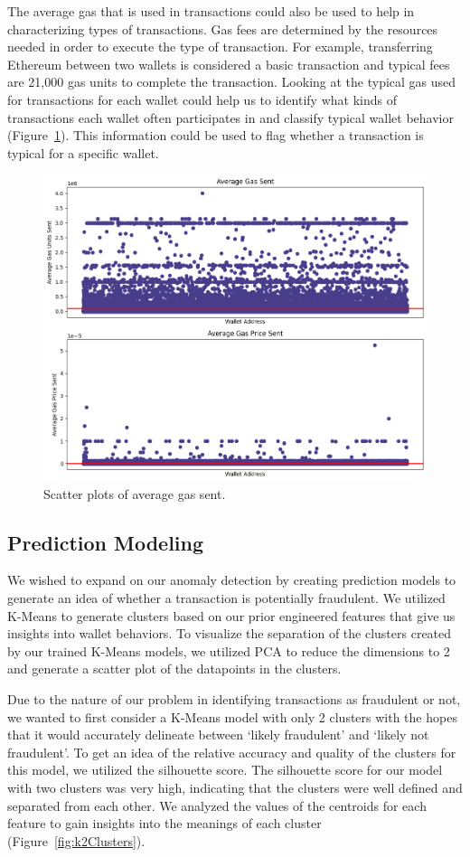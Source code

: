 \documentclass[sigconf]{acmart}
\begin{document}
The average gas that is used in transactions could also be used to help in characterizing types of transactions. Gas fees are determined by the resources needed in order to execute the type of transaction. For example, transferring Ethereum between two wallets is considered a basic transaction and typical fees are 21,000 gas units to complete the transaction. Looking at the typical gas used for transactions for each wallet could help us to identify what kinds of transactions each wallet often participates in and classify typical wallet behavior (Figure~\ref{fig:m6StackedAvgGasSent}). This information could be used to flag whether a transaction is typical for a specific wallet.

\begin{figure}[H]
    \centering
    \includegraphics[width=0.8\linewidth]{M6-2-avg-gas-sent.png}
    \caption{Scatter plots of average gas sent.}
    \label{fig:m6StackedAvgGasSent}
\end{figure}
	

\subsection{Prediction Modeling}
We wished to expand on our anomaly detection by creating prediction models to generate an idea of whether a transaction is potentially fraudulent. We utilized K-Means to generate clusters based on our prior engineered features that give us insights into wallet behaviors. To visualize the separation of the clusters created by our trained K-Means models, we utilized PCA to reduce the dimensions to 2 and generate a scatter plot of the datapoints in the clusters.  

Due to the nature of our problem in identifying transactions as fraudulent or not, we wanted to first consider a K-Means model with only 2 clusters with the hopes that it would accurately delineate between ‘likely fraudulent’ and ‘likely not fraudulent’. To get an idea of the relative accuracy and quality of the clusters for this model, we utilized the silhouette score. The silhouette score for our model with two clusters was very high, indicating that the clusters were well defined and separated from each other. We analyzed the values of the centroids for each feature to gain insights into the meanings of each cluster (Figure~\ref{fig:k2Clusters}).  
\end{document}
